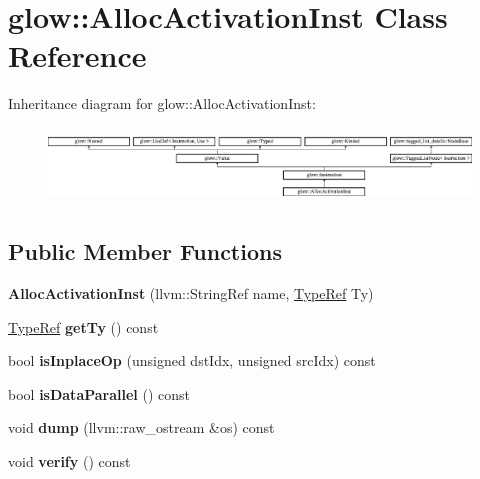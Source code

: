 \hypertarget{classglow_1_1_alloc_activation_inst}{}\section{glow\+:\+:Alloc\+Activation\+Inst Class Reference}
\label{classglow_1_1_alloc_activation_inst}
Inheritance diagram for glow\+:\+:Alloc\+Activation\+Inst\+:\begin{figure}[H]
\begin{center}
\leavevmode
\includegraphics[height=1.991111cm]{classglow_1_1_alloc_activation_inst}
\end{center}
\end{figure}
\subsection*{Public Member Functions}
\begin{DoxyCompactItemize}
\item 
\mbox{\label{classglow_1_1_alloc_activation_inst_a3206f9db80ce7553ccd184fc961164ca}} 
{\bfseries Alloc\+Activation\+Inst} (llvm\+::\+String\+Ref name, \hyperlink{structglow_1_1_type}{Type\+Ref} Ty)
\item 
\mbox{\label{classglow_1_1_alloc_activation_inst_ace40efd9cc59b06a541ca3925903b67d}} 
\hyperlink{structglow_1_1_type}{Type\+Ref} {\bfseries get\+Ty} () const
\item 
\mbox{\label{classglow_1_1_alloc_activation_inst_afae4c8aadb179a9ba9fe2159db6092d7}} 
bool {\bfseries is\+Inplace\+Op} (unsigned dst\+Idx, unsigned src\+Idx) const
\item 
\mbox{\label{classglow_1_1_alloc_activation_inst_a5dcbfb8caee89e8ca821818dc80ef9ff}} 
bool {\bfseries is\+Data\+Parallel} () const
\item 
\mbox{\label{classglow_1_1_alloc_activation_inst_afacb645605a4cbc0deee70f2000d9d77}} 
void {\bfseries dump} (llvm\+::raw\+\_\+ostream \&os) const
\item 
\mbox{\label{classglow_1_1_alloc_activation_inst_a82c88b253b1f7a9b4fc91fe7fe677471}} 
void {\bfseries verify} () const
\end{DoxyCompactItemize}
